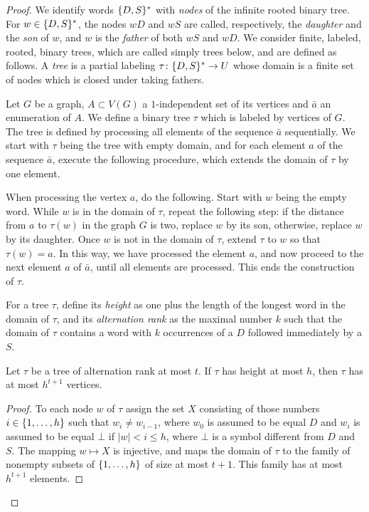 \begin{proof}
	\newcommand{\dau}{D}
	\newcommand{\son}{S}
	
	We identify words  $\set{\dau,\son}^*$ with \emph{nodes}
	of the infinite rooted binary tree. For $w\in \set{\dau,\son}^*$,
	 the nodes $w\dau$ and $w\son$ are called, respectively, the \emph{daughter} and the \emph{son} of $w$,
	and $w$ is the \emph{father} of both $w\son$ and $w\dau$.
	We consider
	 finite, labeled, rooted, binary trees, which are called simply trees below, and are defined as follows.
	 A \emph{tree} is a partial labeling $\tau\from \set{\dau,\son}^*\to U$ whose domain is a finite set of nodes which is closed under taking fathers.
  
  Let $G$ be a graph, $A\subset V(G)$ a $1$-independent set of its vertices
  and $\bar a$ an enumeration of $A$.
We define  a binary tree $\tau$ which is 
  labeled by vertices of $G$. The tree is defined by processing all elements of the sequence $\bar a$ sequentially. We start with $\tau$ being the  tree with empty domain, and for each element $a$ of the sequence $\bar a$, execute the following procedure, which extends the domain of $\tau$ by one element.
  
When processing the vertex $a$, do the following. Start with $w$ being the empty word. While $w$ is in the domain of $\tau$, repeat the following step: 
  if the distance from $a$ to $\tau(w)$ in the graph 
  $G$ is two, replace $w$ by its son, otherwise, replace $w$ by its daughter.
  Once $w$ is not in the domain of $\tau$, extend $\tau$ to $w$    so that  $\tau(w)=a$. In this way, we have processed the element $a$, and now
    proceed to the next element $a$ of $\bar a$, until all elements are processed. This ends the construction of $\tau$.
	
  
  
  
  \medskip
For a tree $\tau$, define its
\emph{height} as one plus 
the length of the longest word in the domain of $\tau$,
and 
its
 \emph{alternation rank}
as the maximal number $k$ such that 
the domain of $\tau$ contains a word with $k$ occurrences of 
a $\dau$ followed immediately by a $\son$.


\begin{lemma}\label{lem:number-of-nodes}
	Let $\tau$ be a tree of alternation rank at most $t$.
	If $\tau$ has height at most $h$, then $\tau$ has at most $h^{t+1}$
	vertices.
\end{lemma}
\begin{proof}	
	To each node $w$ of $\tau$ assign 
	the set $X$ 
	consisting of those numbers $i\in \{1,\ldots,h\}$
	such that $w_i\neq w_{i-1}$, 
	where $w_0$ is assumed to be equal $\dau$
	and $w_i$ is assumed to be equal $\bot$ if $|w|<i\le h$, where $\bot$
	is a symbol different from $\dau$ and $\son$.
	The mapping $w\mapsto X$ is injective, and maps the domain of $\tau$
to the family of nonempty subsets of  $\{1,\ldots,h\}$ of size at most $t+1$.
This family has at most $h^{t+1}$ elements.	
\end{proof}


\end{proof}
